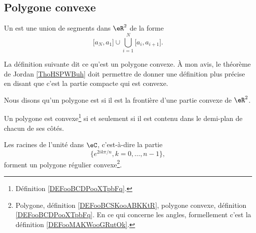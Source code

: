 \subsection{Polygone convexe}

\begin{definition}        \label{DEFooBCSKooABKKtR}
	Un  est une union de segments dans \( \eR^2\) de la forme
	\begin{equation}
		\mathopen[ a_N , a_1 \mathclose]\cup\bigcup_{i=1}^N\mathopen[ a_i , a_{i+1} \mathclose].
	\end{equation}
\end{definition}

La définition suivante dit ce qu'est un polygone convexe. À mon avis, le théorème de Jordan \ref{ThoHSPWBuh} doit permettre de donner une définition plus précise en disant que c'est la partie compacte qui est convexe.
\begin{definition}      \label{DEFooBCDPooXTpbFq}
	Nous disons qu'un polygone est  si il est la frontière d'une partie convexe de \( \eR^2\).
\end{definition}

\begin{proposition}       \label{PROPooFYRMooTqVDEm}
	Un polygone est convexe\footnote{Définition \ref{DEFooBCDPooXTpbFq}.} si et seulement si il est contenu dans le demi-plan de chacun de ses côtés.
\end{proposition}

\begin{proposition}     \label{PROPooUPPTooZBFvPg}
	Les racines de l'unité dans \( \eC\), c'est-à-dire la partie
	\begin{equation}
		\{  e^{2ik\pi/n},k=0,\ldots, n-1 \},
	\end{equation}
	forment un polygone régulier convexe\footnote{Polygone, définition \ref{DEFooBCSKooABKKtR}, polygone convexe, définition \ref{DEFooBCDPooXTpbFq}. En ce qui concerne les angles, formellement c'est la définition \ref{DEFooMAKWooGRutOk}.}.
\end{proposition}

